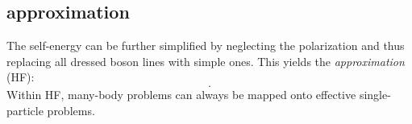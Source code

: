 \subsection{ approximation}

The self-energy can be further simplified by neglecting the polarization and
thus replacing all dressed boson lines with simple ones. This yields the
\emph{ approximation} (HF):
%
\begin{equation}
    .
\end{equation}
%
Within HF, many-body problems can always be mapped onto effective
single-particle problems.
